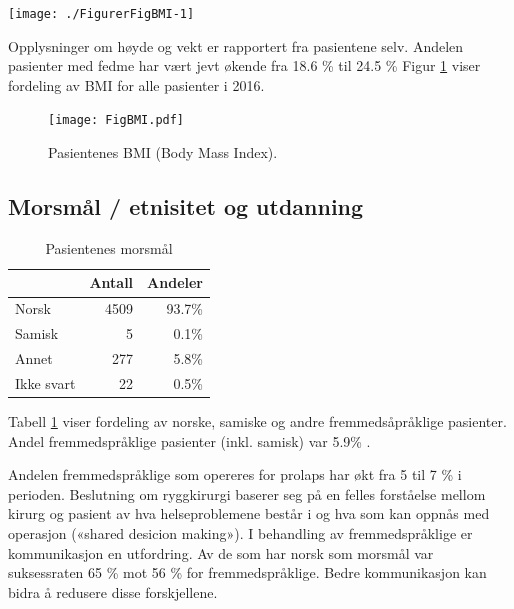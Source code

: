 \documentclass [norsk,a4paper,twoside]{article}\usepackage[]{graphicx}\usepackage[]{color}
\newenvironment{knitrout}{}{} %
\begin{document}
\begin{knitrout}
\color{fgcolor}

{\centering \texttt{[image: ./FigurerFigBMI-1]} 

}



\end{knitrout}

Opplysninger om høyde og vekt er rapportert fra pasientene selv.
Andelen pasienter med fedme har vært jevt økende fra 18.6 \%
til 24.5 \%
Figur \ref{fig:BMI} viser fordeling av BMI for alle pasienter i 2016. 

\begin{figure}[ht]
	\centering \texttt{[image: FigBMI.pdf]}
	\caption{\label{fig:BMI} Pasientenes BMI (Body Mass Index).}
\end{figure}





\subsection{Morsmål / etnisitet og utdanning}

\begin{table}[ht]
\centering
\begin{tabular}{lrr}
  \hline
 & Antall & Andeler \\ 
  \hline
Norsk & 4509 & 93.7\% \\ 
  Samisk & 5 & 0.1\% \\ 
  Annet & 277 & 5.8\% \\ 
  Ikke svart & 22 & 0.5\% \\ 
   \hline
\end{tabular}
\caption{Pasientenes morsmål} 
\label{tab:Morsm}
\end{table}


Tabell \ref{tab:Morsm} viser fordeling av norske, samiske og andre fremmedsåpråklige pasienter.
Andel fremmedspråklige pasienter (inkl. samisk) var 5.9\% . 

Andelen fremmedspråklige som opereres for prolaps har økt fra 5 til 7 \% i perioden.
Beslutning om ryggkirurgi baserer seg på en felles forståelse mellom kirurg og
pasient av hva helseproblemene består i og hva som kan oppnås med operasjon
(«shared desicion making»). I behandling av fremmedspråklige er kommunikasjon
en utfordring. Av de som har norsk som morsmål var suksessraten 65 \% mot 56 \%
for fremmedspråklige. Bedre kommunikasjon kan bidra å redusere disse
forskjellene.
\end{document}
